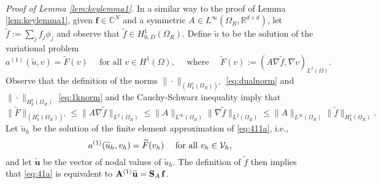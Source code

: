 \documentclass[10pt]{article}%
\newenvironment{proof}[1][Proof]{\noindent \emph{#1.} }
{\hfill \ \rule{0.5em}{0.5em}}
\numberwithin{equation}{section}
\newcommand{\beq}{\begin{equation}}
\newcommand{\eeq}{\end{equation}}
\newcommand{\bpf}{\begin{proof}}
\newcommand{\cV}{{\cal V}}
\newcommand{\bu}{\mathbf{u}}
\newcommand{\bff}{\mathbf{f}}
\newcommand{\Rea}{\mathbb{R}}
\newcommand{\Com}{\mathbb{C}}
\newcommand{\OR}{{\Omega_R}}
\newcommand{\HoDkk}{{H^1_{k}(\domain_R)}}
\newcommand{\domain}{\Omega}
\newcommand{\matrixS}{{\bf S}}
\newcommand{\matrixAo}{{\bf A}^{(1)}}
\newcommand{\tu}{\widetilde{u}}
\newcommand{\tbu}{\widetilde{\bu}}
\begin{document}
\

\bpf[Proof of Lemma \ref{lem:keylemma1}]
In a similar way to the proof of Lemma \ref{lem:keylemma1}, given $\bff \in \Com^N$ and a symmetric $A\in L^\infty(\OR, \Rea^{d\times d})$, let $\widetilde{f} := \sum_j f_j \phi_j$ and observe that $\widetilde{f} \in H^1_{0,D}(\OR)$. Define $\widetilde{u}$ to be the solution of the variational problem 
\beq\label{eq:411a}
a^{(1)}(\widetilde{u},v)= \widetilde{F}(v) \quad\text{ for all } v\in H^1(\Omega),
\quad\text{ where } \quad
 \widetilde{F}(v) :=(A\nabla\widetilde{f},\nabla v)_{L^2(\Omega)}.
\eeq
Observe that the definition of the norms $\|\cdot\|_{(\HoDkk)'}$ \eqref{eq:dualnorm} and $\|\cdot\|_{\HoDkk}$ \eqref{eq:1knorm} and the Cauchy-Schwarz inequality imply that
\beq\label{eq:Fbound}
\big\| \widetilde{F}\big\|_{(\HoDkk)'}\leq \big\|A\nabla \widetilde{f}\big\|_{L^2(\OR)} \leq \big\|A\big\|_{L^\infty(\OR)} \big\|\nabla \widetilde{f}\big\|_{L^2(\OR)}\leq 
\big\|A\big\|_{L^\infty(\OR)} \big\| \widetilde{f}\big\|_{\HoDkk}.
\eeq
Let $\tu_h$ be the solution of the finite element approximation of \eqref{eq:411a}, i.e.,
\beq\label{eq:41a}
a^{(1)}(\tu_h,v_h)= \widetilde{F}(v_h) \quad\text{ for all } v_h\in \cV_h,
\eeq
and let $\tbu$ be the vector of nodal values of $\tu_h$. The definition of $\widetilde{f}$ then implies that \eqref{eq:41a} is equivalent to $\matrixAo \tbu = \matrixS_A\,\bff$. 
\end{document}
